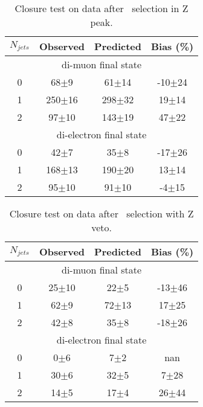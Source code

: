 \begin{table}[!ht]
\begin{center}
\begin{tabular} {|c|ccc|}
\hline
$N_{jets}$  & Observed & Predicted & Bias (\%) \\
\hline 
\hline
\multicolumn{4}{|c|}{di-muon final state} \\
\hline
0 &  68$\pm$9  &  61$\pm$14 & -10$\pm$24 \\
1 & 250$\pm$16 & 298$\pm$32 &  19$\pm$14 \\
2 &  97$\pm$10 & 143$\pm$19 &  47$\pm$22 \\
\hline 
\hline
\multicolumn{4}{|c|}{di-electron final state} \\
\hline
0 &  42$\pm$7  &  35$\pm$8  & -17$\pm$26 \\
1 & 168$\pm$13 & 190$\pm$20 &  13$\pm$14 \\
2 &  95$\pm$10 &  91$\pm$10 &  -4$\pm$15 \\
\hline 
\end{tabular}
\caption{Closure test on data after  \GeVcc\ selection in Z peak.}
\label{tab:data_closure_120_zp}
\end{center}
\end{table}

\begin{table}[!ht]
\begin{center}
\begin{tabular} {|c|ccc|}
\hline
$N_{jets}$  & Observed & Predicted & Bias (\%) \\
\hline 
\hline
\multicolumn{4}{|c|}{di-muon final state} \\
\hline
0 & 25$\pm$10 & 22$\pm$5  & -13$\pm$46 \\
1 & 62$\pm$9  & 72$\pm$13 &  17$\pm$25 \\
2 & 42$\pm$8  & 35$\pm$8  & -18$\pm$26 \\
\hline 
\hline
\multicolumn{4}{|c|}{di-electron final state} \\
\hline
0 &  0$\pm$6 &  7$\pm$2 &    nan    \\
1 & 30$\pm$6 & 32$\pm$5 &  7$\pm$28 \\
2 & 14$\pm$5 & 17$\pm$4 & 26$\pm$44 \\
\hline 
\end{tabular}
\caption{Closure test on data after  \GeVcc\ selection with Z veto.}
\label{tab:data_closure_120_zv}
\end{center}
\end{table}

\clearpage
